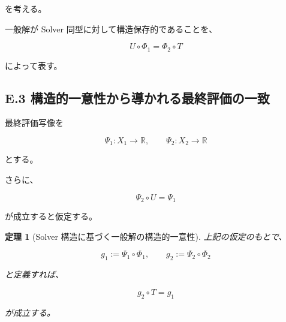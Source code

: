\documentclass[a4paper,11pt]{article}
\newtheorem{theorem}[definition]{定理}
\newcommand{\R}{\mathbb{R}}
\begin{document}
を考える。

一般解が Solver 同型に対して構造保存的であることを、

\begin{equation}
    \boxed{
        U\circ\Phi_1
        =
        \Phi_2\circ T
    }
\end{equation}

によって表す。


\subsection{E.3 構造的一意性から導かれる最終評価の一致}

最終評価写像を

\begin{equation}
    \Psi_1:X_1\to\R,
    \qquad
    \Psi_2:X_2\to\R
\end{equation}

とする。

さらに、

\begin{equation}
    \Psi_2\circ U
    =
    \Psi_1
\end{equation}

が成立すると仮定する。

\begin{theorem}[Solver 構造に基づく一般解の構造的一意性]
上記の仮定のもとで、

\begin{equation}
    g_1:=\Psi_1\circ\Phi_1,
    \qquad
    g_2:=\Psi_2\circ\Phi_2
\end{equation}

と定義すれば、

\begin{equation}
    \boxed{
        g_2\circ T=g_1
    }
\end{equation}

が成立する。
\end{theorem}
\end{document}
